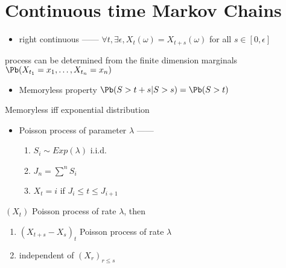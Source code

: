 \section{Continuous time Markov Chains}\label{sec:continous-time-markov-chains}

\begin{itemize}
    \item right continuous ------ $\forall t, \exists \epsilon, X_t(\omega) = X_{t+s}(\omega)$ for all $s \in [0, \epsilon]$
\end{itemize}

\begin{fact}
    process can be determined from the finite dimension marginals $\Pb(X_{t_1} = x_1, \dots, X_{t_n} = x_n)$
\end{fact}
\begin{itemize}
    \item Memoryless property $\Pb(S > t+s | S > s) = \Pb(S > t)$
\end{itemize}

\begin{thm}
    Memoryless iff exponential distribution
\end{thm}

\begin{itemize}
    \item Poisson process of parameter $\lambda$ ------ \begin{enumerate}
                                     \item $S_i \sim Exp(\lambda)$ i.i.d.\
                                     \item $J_n = \sum^n S_i$
                                     \item $X_t = i$ if $J_i \leq t \leq J_{i + 1}$
    \end{enumerate}
\end{itemize}

\begin{thm}
    $(X_t)$ Poisson process of rate $\lambda$, then
    \begin{enumerate}
        \item $(X_{t+s} - X_s)_t$ Poisson process of rate $\lambda$
        \item independent of $(X_r)_{r \leq s}$
    \end{enumerate}
\end{thm}

